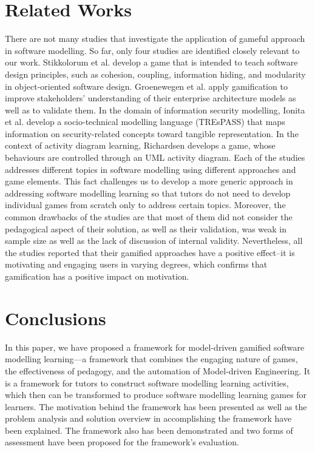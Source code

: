 \documentclass[conference]{IEEEtran}
\begin{document}
\section{Related Works}
\label{Related Works}
There are not many studies that investigate the application of gameful approach in software modelling. So far, only four studies are identified closely relevant to our work. Stikkolorum et al. \cite{Stikkolorum2014} develop a game that is intended to teach software design principles, such as cohesion, coupling, information hiding, and modularity in object-oriented software design. Groenewegen et al. \cite{Groenewegen2010} apply gamification to improve stakeholders' understanding of their enterprise architecture models as well as to validate them. In the domain of information security modelling, Ionita et al.\cite{Ionita2015} develop a socio-technical modelling language (TREsPASS) that maps information on security-related concepts toward tangible representation. In the context of activity diagram learning, Richardsen \cite{Richardsen2014} develops a game, whose behaviours are controlled through an UML activity diagram. Each of the studies addresses different topics in software modelling using different approaches and game elements. This fact challenges us to develop a more generic approach in addressing software modelling learning so that tutors do not need to develop individual games from scratch only to address certain topics. Moreover, the common drawbacks of the studies are that most of them did not consider the pedagogical aspect of their solution, as well as their validation, was weak in sample size as well as the lack of discussion of internal validity. Nevertheless, all the studies reported that their gamified approaches have a positive effect--it is motivating and engaging users in varying degrees, which confirms that gamification has a positive impact on motivation.

\section{Conclusions}
\label{Conclusions}
In this paper, we have proposed a framework for model-driven gamified software modelling learning---a framework that combines the engaging nature of games, the effectiveness of pedagogy, and the automation of Model-driven Engineering. It is a framework for tutors to construct software modelling learning activities, which then can be transformed to produce software modelling learning games for learners. The motivation behind the framework has been presented as well as the problem analysis and solution overview in accomplishing the framework have been explained. The framework also has been demonstrated and two forms of assessment have been proposed for the framework's evaluation.
\end{document}
